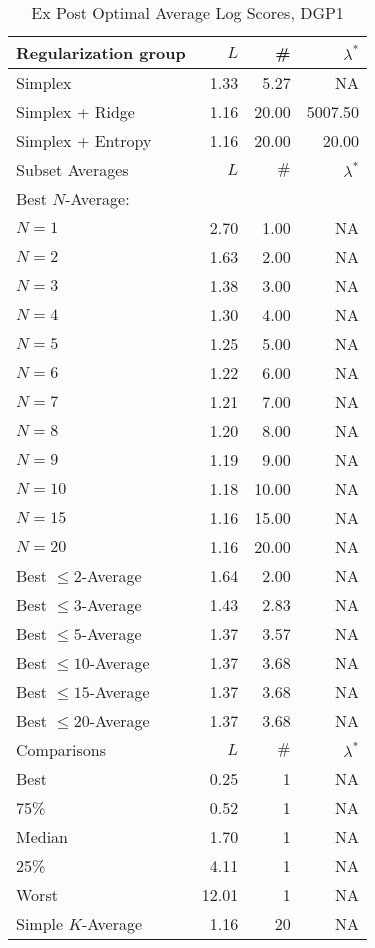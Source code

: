 \begin{table}[htp] 
\begin{center} 
\caption{Ex Post Optimal Average Log Scores, DGP1} 
\begin{tabular}{lrrr} 
\toprule 
\toprule 
Regularization group & $ L $ & \# & $\lambda^*$ \\ 
\midrule 
Simplex & 1.33 & 5.27 & NA \\ 
Simplex + Ridge & 1.16 & 20.00 & 5007.50 \\ 
Simplex + Entropy & 1.16 & 20.00 & 20.00 \\ 
\midrule 
\midrule 
Subset Averages & $ L $ & $\#$ & $\lambda^*$ \\ 
\midrule 
Best $N$-Average: &  &  & \\ 
\quad $N = 1$ & 2.70 & 1.00 & NA \\ 
\quad $N = 2$ & 1.63 & 2.00 & NA \\ 
\quad $N = 3$ & 1.38 & 3.00 & NA \\ 
\quad $N = 4$ & 1.30 & 4.00 & NA \\ 
\quad $N = 5$ & 1.25 & 5.00 & NA \\ 
\quad $N = 6$ & 1.22 & 6.00 & NA \\ 
\quad $N = 7$ & 1.21 & 7.00 & NA \\ 
\quad $N = 8$ & 1.20 & 8.00 & NA \\ 
\quad $N = 9$ & 1.19 & 9.00 & NA \\ 
\quad $N = 10$ & 1.18 & 10.00 & NA \\ 
\quad $N = 15$ & 1.16 & 15.00 & NA \\ 
\quad $N = 20$ & 1.16 & 20.00 & NA \\ 
Best $\leq 2$-Average & 1.64 & 2.00 & NA \\ 
Best $\leq 3$-Average & 1.43 & 2.83 & NA \\ 
Best $\leq 5$-Average & 1.37 & 3.57 & NA \\ 
Best $\leq 10$-Average & 1.37 & 3.68 & NA \\ 
Best $\leq 15$-Average & 1.37 & 3.68 & NA \\ 
Best $\leq 20$-Average & 1.37 & 3.68 & NA \\ 
\midrule 
\midrule 
Comparisons & $ L $ & $\#$ & $\lambda^*$ \\ 
\midrule 
Best & 0.25 & 1 & NA \\ 
75\% & 0.52 & 1 & NA \\ 
Median & 1.70 & 1 & NA \\ 
25\% & 4.11 & 1 & NA \\ 
Worst & 12.01 & 1 & NA \\ 
\midrule 
Simple $K$-Average & 1.16 & 20 & NA \\ 
\bottomrule 
\bottomrule 
\end{tabular} 
\end{center} 
\end{table} 
